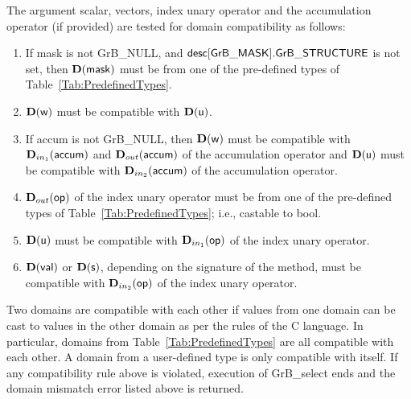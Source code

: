 The argument scalar, vectors, index unary operator and the accumulation 
operator (if provided) are tested for domain compatibility as follows:
\begin{enumerate}
    \item If {\sf mask} is not {\sf GrB\_NULL}, and ${\sf desc[GrB\_MASK].GrB\_STRUCTURE}$
    is not set, then $\bold{D}({\sf mask})$ must be from one of the pre-defined types of 
    Table~\ref{Tab:PredefinedTypes}.

    \item $\bold{D}({\sf w})$ must be compatible with $\bold{D}({\sf u})$.

    \item If {\sf accum} is not {\sf GrB\_NULL}, then $\bold{D}({\sf w})$ must be
    compatible with $\mbox{$\mathbf{D}_{in_{1}}$}({\sf accum})$ and $\mbox{$\mathbf{D}_{out}$}({\sf accum})$ of the accumulation operator and 
    $\bold{D}({\sf u})$ must be compatible with $\mbox{$\mathbf{D}_{in_{2}}$}({\sf accum})$ of the accumulation operator.

	\item $\mbox{$\mathbf{D}_{out}$}({\sf op})$ of the index unary operator must be from one of the pre-defined types of 
    Table~\ref{Tab:PredefinedTypes}; i.e., castable to {\sf bool}.

    \item $\bold{D}({\sf u})$ must be compatible with $\mbox{$\mathbf{D}_{in_{1}}$}({\sf op})$ of the index unary operator.
    
    \item $\bold{D}({\sf val})$ or $\bold{D}({\sf s})$, depending on the signature of the method,
    must be compatible with $\mbox{$\mathbf{D}_{in_{2}}$}({\sf op})$ of the index unary operator.
\end{enumerate}

Two domains are compatible with each other if values from one domain can be cast 
to values in the other domain as per the rules of the C language.
In particular, domains from Table~\ref{Tab:PredefinedTypes} are all compatible 
with each other. A domain from a user-defined type is only compatible with itself.
If any compatibility rule above is violated, execution of {\sf GrB\_select} ends
and the domain mismatch error listed above is returned.

